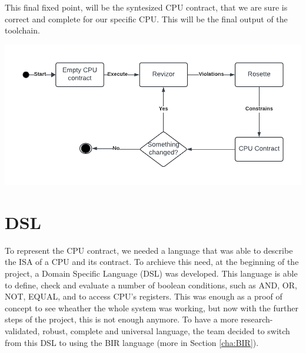 This final fixed point, will be the syntesized CPU contract, that we are sure is
correct and complete for our specific CPU. This will be the final output of the toolchain.
\begin{center}
  \includegraphics[width=.6\textwidth]{images/Thesis.png}
\end{center}

\section{DSL}
\label{cha:DSL} To represent the CPU contract, we needed a language that was
able to describe the ISA of a CPU and its contract. To archieve this need, at
the beginning of the project, a Domain Specific Language (DSL) was developed.
This language is able to define, check and evaluate a number of boolean conditions,
such as AND, OR, NOT, EQUAL, and to access CPU's registers. This was enough as a
proof of concept to see wheather the whole system was working, but now with the
further steps of the project, this is not enough anymore. To have a more
research-validated, robust, complete and universal language, the team decided to
switch from this DSL to using the BIR language (more in Section \ref{cha:BIR}).

